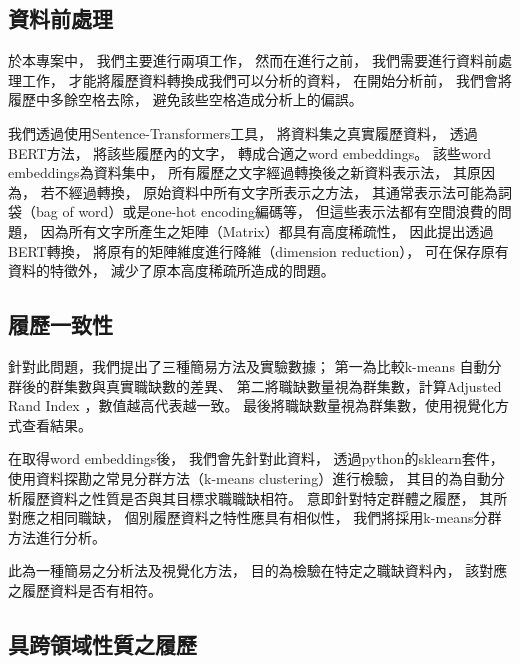 \documentclass[sigconf]{acmart}
\begin{document}
\subsection{資料前處理}

於本專案中，
我們主要進行兩項工作，
然而在進行之前，
我們需要進行資料前處理工作，
才能將履歷資料轉換成我們可以分析的資料，
在開始分析前，
我們會將履歷中多餘空格去除，
避免該些空格造成分析上的偏誤。

我們透過使用Sentence-Transformers\cite{reimers-2020-multilingual-sentence-bert}工具，
將資料集之真實履歷資料，
透過BERT方法\cite{devlin2018bert}，
將該些履歷內的文字，
轉成合適之word embeddings。
該些word embeddings為資料集中，
所有履歷之文字經過轉換後之新資料表示法，
其原因為，
若不經過轉換，
原始資料中所有文字所表示之方法，
其通常表示法可能為詞袋（bag of word）或是one-hot encoding編碼等，
但這些表示法都有空間浪費的問題，
因為所有文字所產生之矩陣（Matrix）都具有高度稀疏性\cite{schutze2008introduction}，
因此提出透過BERT轉換\cite{devlin2018bert}，
將原有的矩陣維度進行降維（dimension reduction），
可在保存原有資料的特徵外，
減少了原本高度稀疏所造成的問題。

\subsection{履歷一致性}

針對此問題，我們提出了三種簡易方法及實驗數據；
第一為比較k-means \cite{macqueen1967some}自動分群後的群集數與真實職缺數的差異、
第二將職缺數量視為群集數，計算Adjusted Rand Index \cite{hubert1985comparing}，數值越高代表越一致。
最後將職缺數量視為群集數，使用視覺化方式查看結果。

在取得word embeddings後，
我們會先針對此資料，
透過python的sklearn\cite{sklearn_api}套件，
使用資料探勘之常見分群方法（k-means clustering）進行檢驗\cite{han2011data}，
其目的為自動分析履歷資料之性質是否與其目標求職職缺相符。
意即針對特定群體之履歷，
其所對應之相同職缺，
個別履歷資料之特性應具有相似性，
我們將採用k-means分群方法\cite{macqueen1967some}進行分析。

此為一種簡易之分析法及視覺化方法，
目的為檢驗在特定之職缺資料內，
該對應之履歷資料是否有相符。


\subsection{具跨領域性質之履歷}
\end{document}
